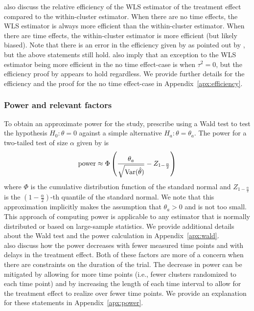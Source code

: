 \documentclass[10pt]{article}
\begin{document}
\citeauthor{Hussey:2007} also discuss the relative efficiency of the WLS estimator of the treatment effect compared to the within-cluster estimator. When there are no time effects, the WLS estimator is always more efficient than the within-cluster estimator. When there are time effects, the within-cluster estimator is more efficient (but likely biased). Note that there is an error in the efficiency given by \textcite{Hussey:2007} as pointed out by \textcite{Liao:2015}, but the above statements still hold. \textcite{Hussey:2007} also imply that an exception to the WLS estimator being more efficient in the no time effect-case is when $\tau^2=0$, but the efficiency proof by \textcite{Liao:2015} appears to hold regardless. We provide further details for the efficiency and the proof for the no time effect-case in Appendix~\ref{apx:efficiency}.

\subsubsection{Power and relevant factors}

To obtain an approximate power for the study, \textcite{Hussey:2007} prescribe using a Wald test to test the hypothesis $H_0:\theta=0$ against a simple alternative $H_a: \theta=\theta_a$. The power for a two-tailed test of size $\alpha$ given by \textcite{Hussey:2007} is
\[
\text{power} \approx \Phi\left(\frac{\theta_a}{\sqrt{\mathrm{Var}(\hat{\theta})}} - Z_{1-\frac{\alpha}{2}}\right)
\]
where $\Phi$ is the cumulative distribution function of the standard normal and $Z_{1-\frac{\alpha}{2}}$ is the $\left(1-\frac{\alpha}{2}\right)$-th quantile of the standard normal. We note that this approximation implicitly makes the assumption that $\theta_a>0$ and is not too small. This approach of computing power is applicable to any estimator that is normally distributed or based on large-sample statistics. We provide additional details about the Wald test and the power calculation in Appendix~\ref{apx:wald}.
\\

\citeauthor{Hussey:2007} also discuss how the power decreases with fewer measured time points and with delays in the treatment effect. Both of these factors are more of a concern when there are constraints on the duration of the trial. The decrease in power can be mitigated by allowing for more time points (i.e., fewer clusters randomized to each time point) and by increasing the length of each time interval to allow for the treatment effect to realize over fewer time points. We provide an explanation for these statements in Appendix~\ref{apx:power}.
\end{document}
